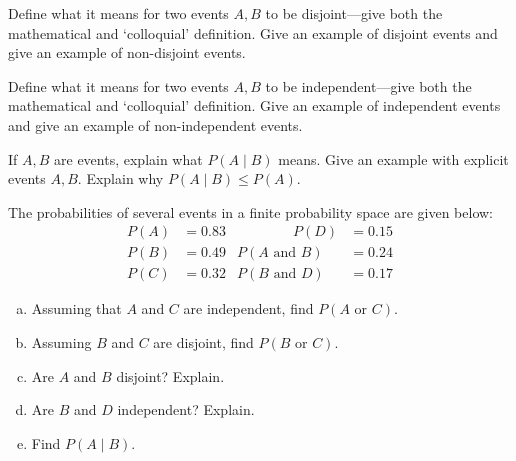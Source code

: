 \documentclass[11pt,letterpaper]{article}
\begin{document}

 Define what it means for two events $A, B$ to be disjoint---give both the mathematical and `colloquial' definition. Give an example of disjoint events and give an example of non-disjoint events. 



\newpage



 Define what it means for two events $A, B$ to be independent---give both the mathematical and `colloquial' definition. Give an example of independent events and give an example of non-independent events. 



\newpage



 If $A, B$ are events, explain what $P(A \;|\; B)$ means. Give an example with explicit events $A, B$. Explain why $P(A \;|\; B) \leq P(A)$. 



\newpage



 The probabilities of several events in a finite probability space are given below:
	\[
	\begin{aligned}
	P(A)&= 0.83 &\qquad\qquad P(D)&= 0.15 \\
	P(B)&= 0.49 & P(A \text{ and } B)&= 0.24 \\
	P(C)&= 0.32 & P(B \text{ and } D)&= 0.17 
	\end{aligned}
	\] 

\begin{enumerate}[(a)]
\item Assuming that $A$ and $C$ are independent, find $P(A \text{ or } C)$.
\item Assuming $B$ and $C$ are disjoint, find $P(B \text{ or } C)$.
\item Are $A$ and $B$ disjoint? Explain.
\item Are $B$ and $D$ independent? Explain. 
\item Find $P(A \;|\; B)$.
\end{enumerate}
\end{document}
